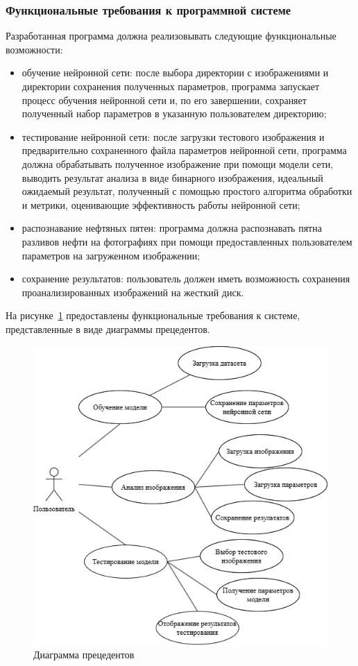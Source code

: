 \subsubsection{Функциональные требования к программной системе}

Разработанная программа должна реализовывать следующие функциональные возможности:

\begin{itemize}
	\item обучение нейронной сети: после выбора директории с изображениями и директории сохранения полученных параметров, программа запускает процесс обучения нейронной сети и, по его завершении, сохраняет полученный набор параметров в указанную пользователем директорию;
	\item тестирование нейронной сети: после загрузки тестового изображения и предварительно сохраненного файла параметров нейронной сети, программа должна обрабатывать полученное изображение при помощи модели сети, выводить результат анализа в виде бинарного изображения, идеальный ожидаемый результат, полученный с помощью простого алгоритма обработки и метрики, оценивающие эффективность работы нейронной сети;
	\item распознавание нефтяных пятен: программа должна распознавать пятна разливов нефти на фотографиях при помощи предоставленных пользователем параметров на загруженном изображении;
	\item сохранение результатов: пользователь должен иметь возможность сохранения проанализированных изображений на жесткий диск.	
\end{itemize}

На рисунке~\ref{fig:usecase} предоставлены функциональные требования к системе, представленные в виде диаграммы прецедентов.

\begin{figure}[H]
	\centering
	\includegraphics[width=1\linewidth]{"images/сценарии использования"}
	\caption{Диаграмма прецедентов}
	\label{fig:usecase}
\end{figure}

